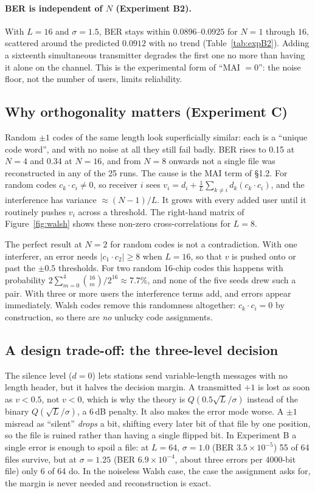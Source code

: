 \documentclass[11pt]{article}
\begin{document}
\paragraph{BER is independent of $N$ (Experiment B2).} With $L=16$ and $\sigma=1.5$, BER
stays within $0.0896$--$0.0925$ for $N=1$ through $16$, scattered around the predicted
$0.0912$ with no trend (Table~\ref{tab:expB2}). Adding a sixteenth simultaneous transmitter
degrades the first one no more than having it alone on the channel. This is the
experimental form of ``MAI $=0$'': the noise floor, not the number of users, limits
reliability.

\subsection{Why orthogonality matters (Experiment C)}
Random $\pm1$ codes of the same length look superficially similar: each is a ``unique code
word'', and with no noise at all they still fail badly. BER rises to 0.15 at $N=4$ and
0.34 at $N=16$, and from $N=8$ onwards not a single file was reconstructed in any of the 25 runs.
The cause is the MAI term of \S1.2. For random codes $c_k\cdot c_i\neq 0$, so receiver $i$
sees
$v_i = d_i + \tfrac{1}{L}\sum_{k\neq i} d_k (c_k\cdot c_i)$, and the interference has
variance $\approx (N-1)/L$. It grows with every added user until it routinely pushes $v_i$
across a threshold. The right-hand matrix of Figure~\ref{fig:walsh} shows these non-zero
cross-correlations for $L=8$.

The perfect result at $N=2$ for random codes is not a contradiction. With one interferer,
an error needs $|c_1\cdot c_2|\ge 8$ when $L=16$, so that $v$ is pushed onto or past the
$\pm0.5$ thresholds. For two random 16-chip codes this happens with probability
$2\sum_{m=0}^{4}\binom{16}{m}/2^{16}\approx 7.7\%$, and none of the five seeds drew such a
pair. With three or more users the interference terms add, and errors appear immediately.
Walsh codes remove this randomness altogether: $c_k\cdot c_i = 0$ by construction, so
there are \emph{no} unlucky code assignments.

\subsection{A design trade-off: the three-level decision}
The silence level ($d=0$) lets stations send variable-length messages with no length header,
but it halves the decision margin. A transmitted $+1$ is lost as soon as
$v < 0.5$, not $v < 0$, which is why the theory is $Q(0.5\sqrt{L}/\sigma)$ instead of the
binary $Q(\sqrt{L}/\sigma)$, a $6$\,dB penalty. It also makes the error mode worse. A
$\pm1$ misread as ``silent'' \emph{drops} a bit, shifting every later bit of that file by
one position, so the file is ruined rather than having a single flipped bit. In
Experiment B a single error is enough to spoil a file: at $L=64$, $\sigma=1.0$ (BER
$3.5\times10^{-5}$) 55 of 64 files survive, but at $\sigma=1.25$ (BER $6.9\times10^{-4}$, about
three errors per 4000-bit file) only 6 of 64 do. In the noiseless Walsh case, the case the assignment asks for, the margin
is never needed and reconstruction is exact.
\end{document}
